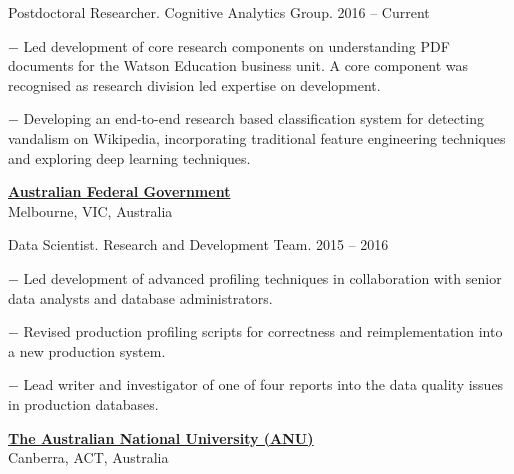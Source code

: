 \documentclass[10pt]{article}
\newcommand{\halfblankline}{\quad\vspace{-0.5\baselineskip}\pagebreak[3]}
\begin{document}
\begin{outerlist}
	\item Postdoctoral Researcher. Cognitive Analytics Group. \hfill {2016 -- Current}
	\begin{innerlist}
		\item[$-$] Led development of core research components on understanding PDF documents for the Watson Education business unit. A core component was recognised as research division led expertise on development.
		\item[$-$] Developing an end-to-end research based classification system for detecting vandalism on Wikipedia, incorporating traditional feature engineering techniques and exploring deep learning techniques.
  \end{innerlist}
\end{outerlist}

\halfblankline

\href{http://www.australia.gov.au/}{\textbf{Australian Federal Government}}\\
Melbourne, VIC, Australia

\begin{outerlist}
	\item Data Scientist. Research and Development Team. \hfill {2015 -- 2016}
	\begin{innerlist}
		\item[$-$] Led development of advanced profiling techniques in collaboration with senior data analysts and database administrators.
		\item[$-$] Revised production profiling scripts for correctness and reimplementation into a new production system.
		\item[$-$] Lead writer and investigator of one of four reports into the data quality issues in production databases.
  \end{innerlist}
\end{outerlist}

\halfblankline

\href{http://www.anu.edu.au/}{\textbf{The Australian National University (ANU)}}\\
Canberra, ACT, Australia
\end{document}
